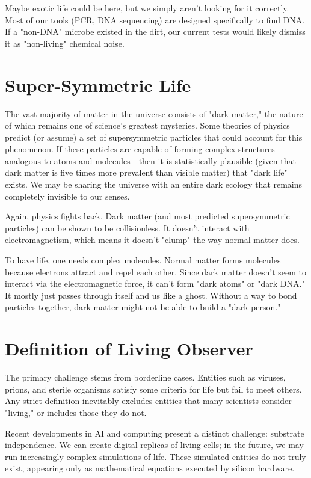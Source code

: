 Maybe exotic life could be here, but we simply aren't looking for it correctly.
Most of our tools (PCR, DNA sequencing) are designed specifically to find DNA.
If a "non-DNA" microbe existed in the dirt, our current tests would likely dismiss it as "non-living" chemical noise.


\section*{Super-Symmetric Life}

The vast majority of matter in the universe consists of "dark matter," the nature of which remains one of science's greatest mysteries.
Some theories of physics predict (or assume) a set of supersymmetric particles that could account for this phenomenon.
If these particles are capable of forming complex structures—analogous to atoms and molecules—then it is statistically plausible
(given that dark matter is five times more prevalent than visible matter) that "dark life" exists.
We may be sharing the universe with an entire dark ecology that remains completely invisible to our senses.

Again, physics fights back. Dark matter (and most predicted supersymmetric particles) can be shown to be collisionless.
It doesn't interact with electromagnetism, which means it doesn't "clump" the way normal matter does.

To have life, one needs complex molecules. Normal matter forms molecules because electrons attract and repel each other.
Since dark matter doesn't seem to interact via the electromagnetic force, it can't form "dark atoms" or "dark DNA."
It mostly just passes through itself and us like a ghost. Without a way to bond particles together, dark matter might not be able to build a "dark person."


\section{Definition of Living Observer}

The primary challenge stems from borderline cases.
Entities such as viruses, prions, and sterile organisms satisfy some criteria for life but fail to meet others.
Any strict definition inevitably excludes entities that many scientists consider "living," or includes those they do not.

Recent developments in AI and computing present a distinct challenge: substrate independence.
We can create digital replicas of living cells; in the future, we may run increasingly complex simulations of life.
These simulated entities do not truly exist, appearing only as mathematical equations executed by silicon hardware.

